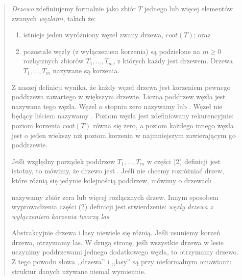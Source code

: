 \begin{quote}

\emph{Drzewo} zdefiniujemy formalnie jako zbiór $T$ jednego lub więcej elementów zwanych \emph{węzłami}, takich że:

\begin{enumerate}
 \item istnieje jeden wyróżniony węzeł zwany  drzewa, $root(T)$; oraz
 \item pozostałe węzły (z wyłączeniem korzenia) są podzielone na $m \geq 0$ rozłącznych zbiorów $T_{1},\ldots, T_{m}$,
	z których każdy jest drzewem. Drzewa $T_{1},\ldots, T_{m}$ nazywane są  korzenia.
\end{enumerate}

Z naszej definicji wynika, że każdy węzeł drzewa jest korzeniem pewnego poddrzewa zawartego w większym drzewie.
Liczna poddrzew węzła jest nazywana  tego węzła.
Węzeł o stopniu zero nazywamy  lub . 
Węzeł nie będący liściem nazywamy . 
Poziom węzła jest zdefiniowany rekurencyjnie: poziom korzenia $root(T)$ równa się zero,
a poziom każdego innego węzła jest o jeden wiekszy niż poziom korzenia w najmniejszym 
 zawierającym go poddrzewie.
%
%



Jeśli względny porządek poddrzew $T_{1},\ldots, T_{m}$ w części (2) definicji jest istotny,
to mówimy, że drzewo jest . 
Jeśli nie chcemy rozróżniać drzew, które różnią się jedynie kolejnością poddrzew, mówimy o drzewach .

 nazywamy zbiór zera lub więcej rozłącznych drzew. 
Innym sposobem wyprowadzenia części (2) definicji jest stwierdzenie: \textit{węzły drzewa z wyłączeniem korzenia tworzą las}.

Abstrakcyjnie drzewa i lasy niewiele się różnią.
Jeśli usuniemy korzeń drzewa, otrzymamy las.
W drugą stronę, jeśli wszystkie drzewa w lesie uczynimy poddrzewami jednego dodatkowego węzła, to otrzymamy drzewo.
Z tego powodu słowa ,,drzewa'' i ,,lasy'' są przy nieformalnym omawianiu struktur danych używane niemal wymiennie.

\end{quote}

